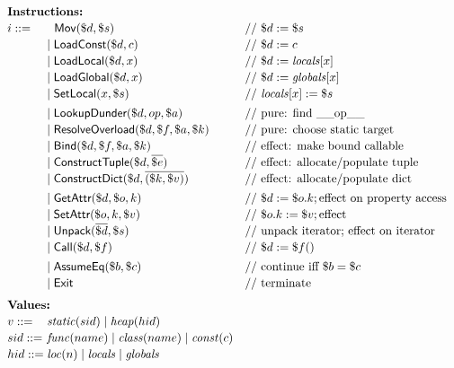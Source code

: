 \begin{figure}[t]
\centering
\[
\renewcommand{\arraystretch}{1.15}
\begin{array}{l@{}ll}
\multicolumn{3}{l}{\textbf{Instructions:}}\\
i ::= \;&\hspace{6pt}\mathsf{Mov}(\$d,\$s) & \text{// } \$d := \$s \\
      &\mid \tLoadConst(\$d,c) & \text{// } \$d := c \\
      &\mid \tLoadLocal(\$d,x) & \text{// } \$d := \mathit{locals}[x] \\
      &\mid \tLoadGlobal(\$d,x) & \text{// } \$d := \mathit{globals}[x] \\
      &\mid \tSetLocal(x,\$s) & \text{// } \mathit{locals}[x] := \$s \\[0.6ex]
      &\mid \tLookupDunder(\$d,op,\$a)  & \text{// pure: find \_\_op\_\_} \\
      &\mid \tResolveOverload(\$d,\$f,\$a,\$k) & \text{// pure: choose static target} \\
      &\mid \tBind(\$d,\$f,\$a,\$k) & \text{// effect: make bound callable} \\
      &\mid \tConstructTuple(\$d,\overline{\$e}) & \text{// effect: allocate/populate tuple} \\
      &\mid \tConstructDict(\$d,\overline{(\$k,\$v)}) & \text{// effect: allocate/populate dict} \\[0.6ex]
      &\mid \tGetAttr(\$d,\$o,k) & \text{// } \$d := \$o.k; \text{effect on property access} \\
      &\mid \tSetAttr(\$o,k,\$v) & \text{// } \$o.k := \$v; \text{effect}\\
      &\mid \tUnpack(\overline{\$d},\$s) & \text{// unpack iterator; effect on iterator} \\
      &\mid \tCall(\$d,\$f) & \text{// } \$d := \$f() \\[0.6ex]
      &\mid \tAssumeEq(\$b,\$c) & \text{// continue iff } \$b = \$c \\
      &\mid \tExit & \text{// terminate} \\[1.1ex]

\multicolumn{3}{l}{\textbf{Values:}}\\
v ::= \;& \mathit{static}(sid) \mid \mathit{heap}(hid) & \\
sid ::= \;& \mathit{func}(name) \mid \mathit{class}(name) \mid \mathit{const}(c) & \\
hid ::= \;& \mathit{loc}(n) \mid \mathit{locals} \mid \mathit{globals} & \\[1.1ex]


\end{array}\]
\end{figure}

